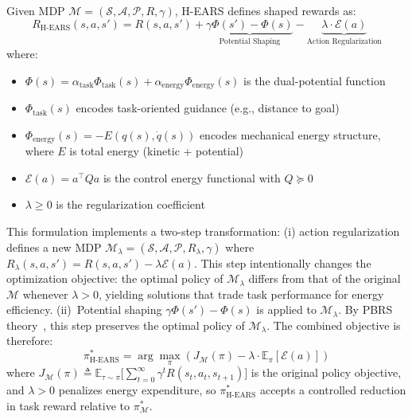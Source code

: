 \documentclass[journal]{IEEEtran}
\begin{document}
	Given MDP $\mathcal{M}=(\mathcal{S},\mathcal{A},\mathcal{P},R,\gamma)$, H-EARS defines shaped rewards as:
	\begin{equation}
		R_{\text{H-EARS}}(s,a,s') = R(s,a,s') + \underbrace{\gamma\Phi(s')-\Phi(s)}_{\text{Potential Shaping}} - \underbrace{\lambda\cdot\mathcal{E}(a)}_{\text{Action Regularization}}
		\label{eq:H-EARS}
	\end{equation}
	where:
	\begin{itemize}
		\item $\Phi(s)=\alpha_{\text{task}}\Phi_{\text{task}}(s)+\alpha_{\text{energy}}\Phi_{\text{energy}}(s)$ is the dual-potential function
		\item $\Phi_{\text{task}}(s)$ encodes task-oriented guidance (e.g., distance to goal)
		\item $\Phi_{\text{energy}}(s) = -E(q(s),\dot{q}(s))$ encodes mechanical energy structure, where $E$ is total energy (kinetic + potential)
		\item $\mathcal{E}(a)=a^\top Qa$ is the control energy functional with $Q\succeq 0$
		\item $\lambda\geq 0$ is the regularization coefficient
	\end{itemize}
	
	This formulation implements a two-step transformation: (i) action regularization defines a new MDP $\mathcal{M}_\lambda = (\mathcal{S}, \mathcal{A}, \mathcal{P}, R_\lambda, \gamma)$ where $R_\lambda(s,a,s') = R(s,a,s') - \lambda\mathcal{E}(a)$. This step intentionally changes the optimization objective: the optimal policy of $\mathcal{M}_\lambda$ differs from that of the original $\mathcal{M}$ whenever $\lambda > 0$, yielding solutions that trade task performance for energy efficiency. (ii)~Potential shaping $\gamma\Phi(s')-\Phi(s)$ is applied to $\mathcal{M}_\lambda$. By PBRS theory~\cite{ng1999policy}, this step preserves the optimal policy of $\mathcal{M}_\lambda$. The combined objective is therefore:
	\begin{equation}
		\pi^*_{\text{H-EARS}} = \arg\max_\pi\left(J_{\mathcal{M}}(\pi) - \lambda\cdot\mathbb{E}_\pi[\mathcal{E}(a)]\right)
		\label{eq:optimal_policy}
	\end{equation}
	where $J_{\mathcal{M}}(\pi) \triangleq \mathbb{E}_{\tau\sim\pi}\bigl[\sum_{t=0}^{\infty}\gamma^t R(s_t,a_t,s_{t+1})\bigr]$ is the original policy objective, and $\lambda > 0$ penalizes energy expenditure, so $\pi^*_{\text{H-EARS}}$ accepts a controlled reduction in task reward relative to $\pi^*_{\mathcal{M}}$.
	
\end{document}
